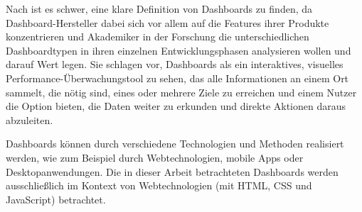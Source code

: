 Nach \autocite[S. 44]{Yigitbasioglu.AReviewOfDashboardsInPerformanceManagement.2012} ist es schwer, eine klare Definition von Dashboards zu finden, da Dashboard-Hersteller dabei sich vor allem auf die Features ihrer Produkte konzentrieren und Akademiker in der Forschung die unterschiedlichen Dashboardtypen in ihren einzelnen Entwicklungsphasen analysieren wollen und darauf Wert legen.
Sie schlagen vor, Dashboards als ein interaktives, visuelles Performance-Überwachungstool zu sehen, das alle Informationen an einem Ort sammelt, die nötig sind, eines oder mehrere Ziele zu erreichen und einem Nutzer die Option bieten, die Daten weiter zu erkunden und direkte Aktionen daraus abzuleiten.

Dashboards können durch verschiedene Technologien und Methoden realisiert werden, wie zum Beispiel durch Webtechnologien, mobile Apps oder Desktopanwendungen.
Die in dieser Arbeit betrachteten Dashboards werden ausschließlich im Kontext von Webtechnologien (mit \ac{HTML}, \ac{CSS} und JavaScript) betrachtet.


